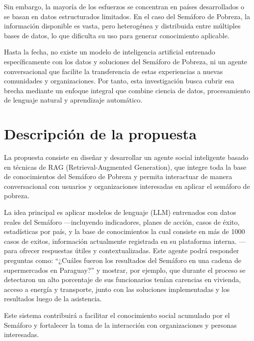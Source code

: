 \documentclass{article}
\begin{document}
Sin embargo, la mayoría de los esfuerzos se concentran en países desarrollados o se basan en datos estructurados limitados. En el caso del Semáforo de Pobreza, la información disponible es vasta, pero heterogénea y distribuida entre múltiples bases de datos, lo que dificulta su uso para generar conocimiento aplicable.

Hasta la fecha, no existe un modelo de inteligencia artificial entrenado específicamente con los datos y soluciones del Semáforo de Pobreza, ni un agente conversacional que facilite la transferencia de estas experiencias a nuevas comunidades y organizaciones. Por tanto, esta investigación busca cubrir esa brecha mediante un enfoque integral que combine ciencia de datos, procesamiento de lenguaje natural y aprendizaje automático.

\section{Descripción de la propuesta}\label{sec:descripcion}
La propuesta consiste en diseñar y desarrollar un agente social inteligente basado en técnicas de RAG (Retrieval-Augmented Generation), que integre toda la base de conocimientos del Semáforo de Pobreza y permita interactuar de manera conversacional con usuarios y organizaciones interesadas en aplicar el semáforo de pobreza.

La idea principal es aplicar modelos de lenguaje (LLM) entrenados con datos reales del Semáforo —incluyendo indicadores, planes de acción, casos de éxito, estadísticas por país, y la base de conocimientos la cual consiste en más de 1000 casos de exitos, información actualmente registrada en su plataforma interna. — para ofrecer respuestas útiles y contextualizadas. Este agente podrá responder preguntas como:
“¿Cuáles fueron los resultados del Semáforo en una cadena de supermercados en Paraguay?”
y mostrar, por ejemplo, que durante el proceso se detectaron un alto porcentaje de sus funcionarios tenían carencias en vivienda, acceso a energía y transporte, junto con las soluciones implementadas y los resultados luego de la asistencia.

Este sistema contribuirá a facilitar el conocimiento social acumulado por el Semáforo y fortalecer la toma de la interacción con organizaciones y personas interesadas.
\end{document}
